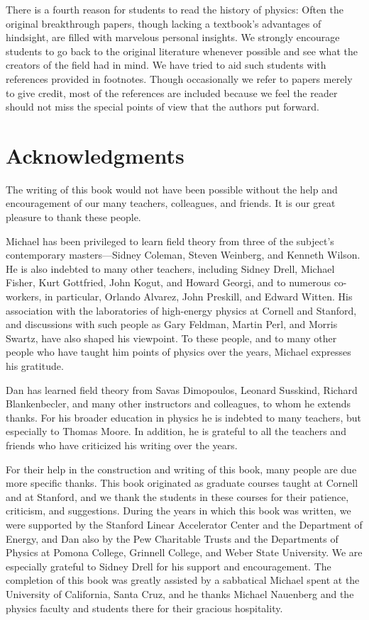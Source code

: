 There is a fourth reason for students to read the history of physics:
Often the original breakthrough papers, though lacking a textbook's
advantages of hindsight, are filled with marvelous personal insights.  We
strongly encourage students to go back to the original literature whenever
possible and see what the creators of the field had in mind.  We have tried
to aid such students with references provided in footnotes.  Though
occasionally we refer to papers merely to give credit, most of the
references are included because we feel the reader should not miss the
special points of view that the authors put forward.

\section*{Acknowledgments}

The writing of this book would not have been possible without the help and
encouragement of our many teachers, colleagues, and friends.  It is our
great pleasure to thank these people.

Michael has been privileged to learn field theory from three of the
subject's contemporary masters---Sidney Coleman, Steven Weinberg, and
Kenneth Wilson.  He is also indebted to many other teachers, including
Sidney Drell, Michael Fisher, Kurt Gottfried, John Kogut, and Howard
Georgi, and to numerous co-workers, in particular, Orlando Alvarez, John
Preskill, and Edward Witten.  His association with the laboratories of
high-energy physics at Cornell and Stanford, and discussions with such
people as Gary Feldman, Martin Perl, and Morris Swartz, have also shaped
his viewpoint.  To these people, and to many other people who have taught
him points of physics over the years, Michael expresses his gratitude.

Dan has learned field theory from Savas Dimopoulos, Leonard Susskind,
Richard Blankenbecler, and many other instructors and colleagues, to whom
he extends thanks.  For his broader education in physics he is indebted to
many teachers, but especially to Thomas Moore.  In addition, he is grateful
to all the teachers and friends who have criticized his writing over the
years.

For their help in the construction and writing of this book, many people
are due more specific thanks.  This book originated as graduate courses
taught at Cornell and at Stanford, and we thank the students in these
courses for their patience, criticism, and suggestions.  During the years
in which this book was written, we were supported by the Stanford Linear
Accelerator Center and the Department of Energy, and Dan also by the Pew
Charitable Trusts and the Departments of Physics at Pomona College,
Grinnell College, and Weber State University.  We are especially grateful
to Sidney Drell for his support and encouragement.  The completion of this
book was greatly assisted by a sabbatical Michael spent at the University
of California, Santa Cruz, and he thanks Michael Nauenberg and the physics
faculty and students there for their gracious hospitality.

